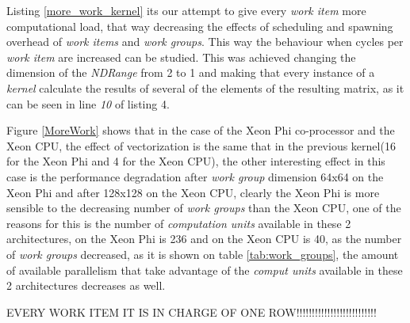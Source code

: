 \par{Listing \ref{more_work_kernel} its our attempt to give every \emph{work item} more computational load, that way decreasing the
    effects of scheduling and spawning overhead of \emph{work items} and \emph{work groups}. This way the behaviour when cycles 
    per \emph{work item} are increased can be studied. This was achieved changing the dimension of the \emph{NDRange} from 2 to 1
    and making that every instance of a \emph{kernel} calculate the results of several of the elements of the resulting matrix,
    as it can be seen in line \emph{10} of listing 4.}

\par{Figure \ref{MoreWork} shows that in the case of the Xeon Phi co-processor and the Xeon CPU, the effect of vectorization
    is the same that in the previous kernel(16 for the Xeon Phi and 4 for the Xeon CPU), the other interesting effect in this
    case is the performance degradation after \emph{work group} dimension 64x64 on the Xeon Phi and after 128x128 on the Xeon
    CPU, clearly the Xeon Phi is more sensible to the decreasing number of \emph{work groups} than the Xeon CPU, one of the 
    reasons for this is the number of \emph{computation units} available in these 2 architectures, on the Xeon Phi is 236 and
    on the Xeon CPU is 40, as the number of \emph{work groups} decreased, as it is shown on table \ref{tab:work_groups}, the amount
    of available parallelism that take advantage of the \emph{comput units} available in these 2 architectures decreases as well.}


\par{{\color{red}EVERY WORK ITEM IT IS IN CHARGE OF ONE ROW!!!!!!!!!!!!!!!!!!!!!!!!!!}}

